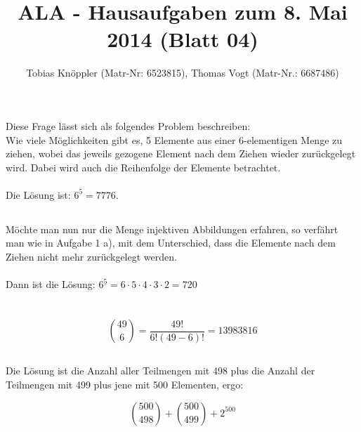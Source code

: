 \documentclass[fleqn]{article}
\title{ALA - Hausaufgaben zum 8. Mai 2014 (Blatt 04)}
\author{Tobias Knöppler (Matr-Nr: 6523815), Thomas Vogt (Matr-Nr.: 6687486)}
\date{\gertoday}
\begin{document}
\maketitle


\section{}
\subsection{}%
Diese Frage lässt sich als folgendes Problem beschreiben:\\
Wie viele Möglichkeiten gibt es, 5 Elemente aus einer 6-elementigen Menge zu ziehen, wobei das jeweils gezogene Element nach dem Ziehen wieder zurückgelegt wird. Dabei wird auch die Reihenfolge der Elemente betrachtet.\\\\
Die Lösung ist: $6^5 = 7776$.

\subsection{}%
Möchte man nun nur die Menge injektiven Abbildungen erfahren, so verfährt man wie in Aufgabe 1 a), mit dem Unterschied, dass die Elemente nach dem Ziehen nicht mehr zurückgelegt werden.\\\\
Dann ist die Lösung: $6^{\underline{5}} = 6 \cdot 5 \cdot 4 \cdot 3 \cdot 2 = 720$

\section{}
\subsection{}
\[ {49 \choose 6} = \frac{49!}{6! (49-6)!} = 13983816 \] 

\subsection{}
Die L\"osung ist die Anzahl aller Teilmengen mit 498 plus die Anzahl der Teilmengen mit 499 plus jene mit 500 Elementen, ergo:

\[ {500 \choose 498} + {500 \choose 499} + 2^{500} \] 

\section{}
\end{document}
